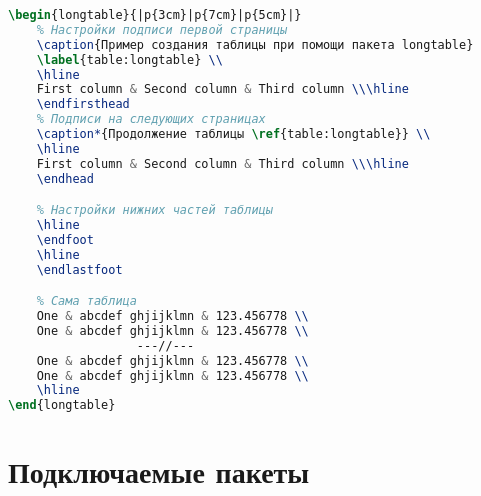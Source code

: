 \begin{appendices}
\newpage

\begin{lstlisting}[language=TeX,
    caption=Исходный код таблицы \ref{table:longtable},
    label=code:table3]
\begin{longtable}{|p{3cm}|p{7cm}|p{5cm}|}
    % Настройки подписи первой страницы
    \caption{Пример создания таблицы при помощи пакета longtable} 
    \label{table:longtable} \\
    \hline 
    First column & Second column & Third column \\\hline 
    \endfirsthead
    % Подписи на следующих страницах
    \caption*{Продолжение таблицы \ref{table:longtable}} \\
    \hline
    First column & Second column & Third column \\\hline
    \endhead

    % Настройки нижних частей таблицы
    \hline
    \endfoot
    \hline
    \endlastfoot 

    % Сама таблица
    One & abcdef ghjijklmn & 123.456778 \\
    One & abcdef ghjijklmn & 123.456778 \\
                  ---//---
    One & abcdef ghjijklmn & 123.456778 \\
    One & abcdef ghjijklmn & 123.456778 \\
    \hline
\end{longtable}
\end{lstlisting}

\chapter{Подключаемые пакеты}
\label{appendix:packages}
\begin{multicols}{3}


\end{multicols}
\end{appendices}
